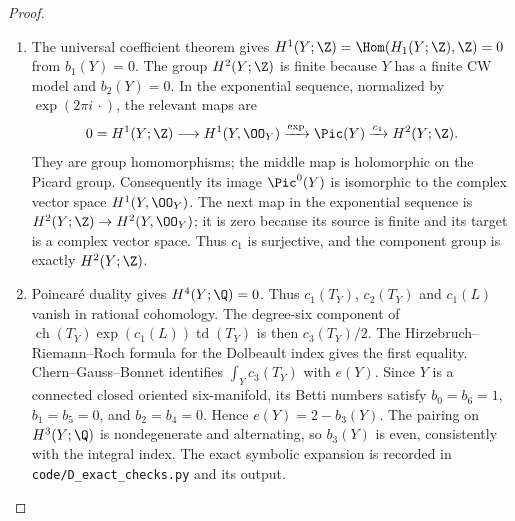 \begin{proof}

\begin{enumerate}[label={$\langle1\rangle$\arabic*.},leftmargin=*]
\item The universal coefficient theorem gives
$H^1(Y;\Z)=\Hom(H_1(Y;\Z),\Z)=0$ from $b_1(Y)=0$.
The group $H^2(Y;\Z)$ is finite because $Y$ has a finite CW model and
$b_2(Y)=0$. In the exponential sequence, normalized by
$\exp(2\pi i\,\cdot)$, the relevant maps are
\[
0=H^1(Y;\Z)\longrightarrow H^1(Y,\OO_Y)
 \xrightarrow{\exp} \Pic(Y)
 \xrightarrow{c_1} H^2(Y;\Z).
\]
They are group homomorphisms; the middle map is holomorphic on the
Picard group. Consequently its image $\Pic^0(Y)$ is isomorphic to the
complex vector space $H^1(Y,\OO_Y)$. The next map in the exponential
sequence is $H^2(Y;\Z)\to H^2(Y,\OO_Y)$; it is zero because its
source is finite and its target is a complex vector space. Thus
$c_1$ is surjective, and the component group is exactly $H^2(Y;\Z)$.

\item Poincar\'e duality gives $H^4(Y;\Q)=0$. Thus
$c_1(T_Y)$, $c_2(T_Y)$ and $c_1(L)$ vanish in rational cohomology.
The degree-six component of
$\operatorname{ch}(T_Y)\exp(c_1(L))\operatorname{td}(T_Y)$ is then
$c_3(T_Y)/2$. The Hirzebruch--Riemann--Roch formula for the Dolbeault
index gives the first equality. Chern--Gauss--Bonnet identifies
$\int_Yc_3(T_Y)$ with $e(Y)$. Since $Y$ is a connected closed oriented
six-manifold, its Betti numbers satisfy
$b_0=b_6=1$, $b_1=b_5=0$, and $b_2=b_4=0$. Hence
$e(Y)=2-b_3(Y)$. The pairing on $H^3(Y;\Q)$ is nondegenerate and
alternating, so $b_3(Y)$ is even, consistently with the integral index.
The exact symbolic expansion is recorded in
\texttt{code/D\_exact\_checks.py} and its output.

\end{enumerate}
\end{proof}

